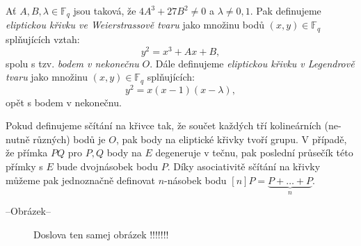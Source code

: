 \documentclass[12pt]{report}
\begin{document}
\begin{definice}
Ať $A,B,\lambda \in \mathbb{F}_q$ jsou taková, že $4 A^3 + 27 B^2 \neq 0$ a $\lambda \neq 0, 1.$ Pak definujeme \textit{eliptickou křivku ve Weierstrassově tvaru} jako množinu bodů $(x,y) \in \mathbb{F}_q$ splňujících vztah:
$$y^2 = x^3 + Ax + B,$$
spolu s tzv. \textit{bodem v nekonečnu} $O$. Dále definujeme \textit{eliptickou křivku v Legendrově tvaru} jako množinu $(x,y) \in \mathbb{F}_q$ splňujících:
$$y^2 = x(x-1)(x-\lambda),$$
opět s bodem v nekonečnu.
\end{definice}
Pokud definujeme sčítání na křivce tak, že součet každých tří kolineárních (ne-nutně různých) bodů je $O$, pak body na eliptické křivky tvoří grupu. V případě, že přímka $PQ$ pro $P,Q$ body na $E$ degeneruje v tečnu, pak poslední průsečík této přímky s $E$ bude dvojnásobek bodu $P$. Díky asociativitě sčítání na křivky můžeme pak jednoznačně definovat $n$-násobek bodu $[n]P = \underbrace{P+\dots+P}_{n}$.

--Obrázek--


\begin{figure}[h]
\begin{center}
\end{center}
\caption{Doslova ten samej obrázek !!!!!!!}
\end{figure}
\end{document}
